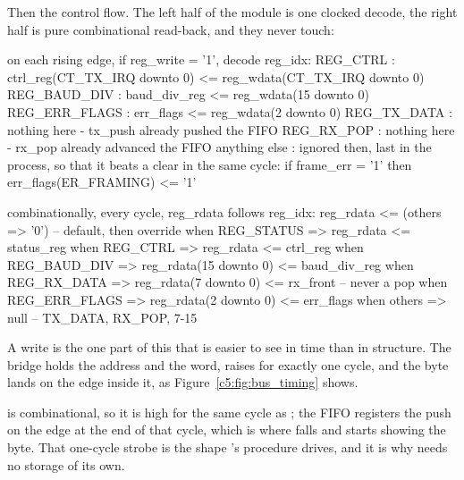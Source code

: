 Then the control flow. The left half of the module is one clocked decode, the right half is pure
combinational read-back, and they never touch:

\begin{console}
on each rising edge, if reg_write = '1', decode reg_idx:
    REG_CTRL       : ctrl_reg(CT_TX_IRQ downto 0) <= reg_wdata(CT_TX_IRQ downto 0)
    REG_BAUD_DIV   : baud_div_reg <= reg_wdata(15 downto 0)
    REG_ERR_FLAGS  : err_flags    <= reg_wdata(2 downto 0)
    REG_TX_DATA    : nothing here - tx_push already pushed the FIFO
    REG_RX_POP     : nothing here - rx_pop already advanced the FIFO
    anything else  : ignored
then, last in the process, so that it beats a clear in the same cycle:
    if frame_err = '1' then err_flags(ER_FRAMING) <= '1'

combinationally, every cycle, reg_rdata follows reg_idx:
    reg_rdata <= (others => '0')                  -- default, then override
    when REG_STATUS    => reg_rdata              <= status_reg
    when REG_CTRL      => reg_rdata              <= ctrl_reg
    when REG_BAUD_DIV  => reg_rdata(15 downto 0) <= baud_div_reg
    when REG_RX_DATA   => reg_rdata(7 downto 0)  <= rx_front  -- never a pop
    when REG_ERR_FLAGS => reg_rdata(2 downto 0)  <= err_flags
    when others        => null                    -- TX_DATA, RX_POP, 7-15
\end{console}

A  write is the one part of this that is easier to see in time than in structure. The
bridge holds the address and the word, raises  for exactly one cycle, and the byte
lands on the edge inside it, as Figure~\ref{c5:fig:bus_timing} shows.


 is combinational, so it is high for the same cycle as ; the FIFO
registers the push on the edge at the end of that cycle, which is where  falls and
 starts showing the byte. That one-cycle strobe is the shape 's
 procedure drives, and it is why  needs no storage of its own.

